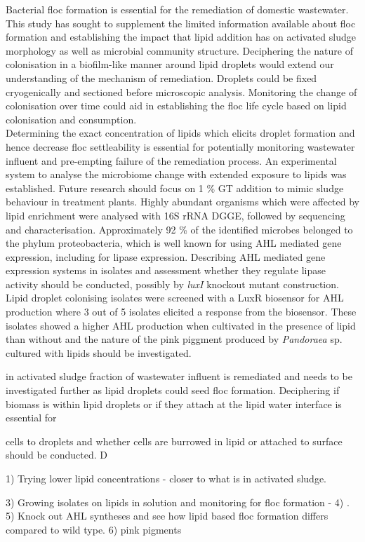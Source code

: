 Bacterial floc formation is essential for the remediation of domestic wastewater. This study has sought to supplement the limited information available about floc formation and establishing the impact that lipid addition has on activated sludge morphology as well as microbial community structure. Deciphering the nature of colonisation in a biofilm-like manner around lipid droplets would extend our understanding of the mechanism of remediation. Droplets could be fixed cryogenically and sectioned before microscopic analysis. Monitoring the change of colonisation over time could aid in establishing the floc life cycle based on lipid colonisation and consumption. \\


Determining the exact concentration of lipids which elicits droplet formation and hence decrease floc settleability is essential for potentially monitoring wastewater influent and pre-empting failure of the remediation process. An experimental system to analyse the microbiome change with extended exposure to lipids was established. Future research should focus on 1 \% GT addition to mimic sludge behaviour in treatment plants. Highly abundant organisms which were affected by lipid enrichment were analysed with 16S rRNA DGGE, followed by sequencing and characterisation. Approximately 92 \% of the identified microbes belonged to the phylum proteobacteria, which is well known for using AHL mediated gene expression, including for lipase expression. Describing AHL mediated gene expression systems in isolates and assessment whether they regulate lipase activity should be conducted, possibly by \emph{luxI} knockout mutant construction.\\

Lipid droplet colonising isolates were screened with a LuxR biosensor for AHL production where 3 out of 5 isolates elicited a response from the biosensor. These isolates showed a higher AHL production when cultivated in the presence of lipid than without and the nature of the pink piggment produced by \emph{Pandoraea} sp. cultured with lipids should be investigated.

 in activated sludge fraction of wastewater influent is remediated and needs to be investigated further as lipid droplets could seed floc formation. Deciphering if biomass is within lipid droplets or if they attach at the lipid water interface is essential for 

 cells to droplets and whether cells are burrowed in lipid or attached to surface should be conducted. D

1) Trying lower lipid concentrations - closer to what is in activated sludge.

3) Growing isolates on lipids in solution and monitoring for floc formation - 
4) .
5) Knock out AHL syntheses and see how lipid based floc formation differs compared to wild type.
6) pink pigments